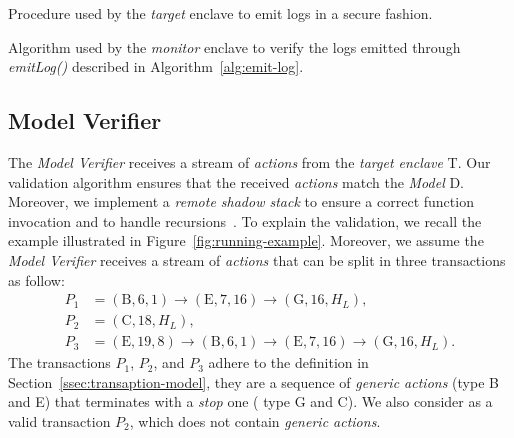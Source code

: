 \begin{algorithm}[t]
	\SetAlgoLined
	\DontPrintSemicolon
	\caption{Procedure used by the \emph{target} enclave to emit logs in a  
		secure fashion.}
	\label{alg:emit-log}
\end{algorithm}
\begin{algorithm}[t]
	\SetAlgoLined
	\DontPrintSemicolon
	\caption{Algorithm used by the \emph{monitor} enclave to verify the 
		logs 
		emitted through \emph{emitLog()} described in 		
		Algorithm~\ref{alg:emit-log}.}
	\label{alg:verify-log}
\end{algorithm}


\subsection{Model Verifier}
\label{sec:model-validation}

The \emph{Model Verifier} receives a stream of \emph{actions} from the 
\emph{target enclave} T.
Our validation algorithm ensures that the received \emph{actions} match the 
\emph{Model} D. 
Moreover, we implement a \emph{remote shadow stack} to ensure a correct 
function invocation and to handle recursions~\citep{scarr}.
To explain the validation, we recall the example illustrated in  
Figure~\ref{fig:running-example}.
Moreover, we assume the \emph{Model Verifier} receives a 
stream of \emph{actions} that can be split in three transactions as follow:
\begin{align*}
P_1 &= (\text{B}, 6, 1) \rightarrow (\text{E}, 7, 16) \rightarrow (\text{G}, 
16, H_L),\\
P_2 &= (\text{C}, 18, H_L),\\
P_3 &= (\text{E}, 19, 8) \rightarrow (\text{B}, 6, 1) \rightarrow (\text{E}, 7, 
16) \rightarrow (\text{G}, 16, H_L).
\end{align*}
The transactions $P_1$, $P_2$, and $P_3$ adhere to the definition in
Section~\ref{ssec:transaption-model}, \ie they are a sequence of \emph{generic 
	actions} (\ie type B and E) that terminates with a \emph{stop} one (\ie 
	type G 
and C). 
We also consider as a valid transaction $P_2$, which does not contain 
\emph{generic actions}.

